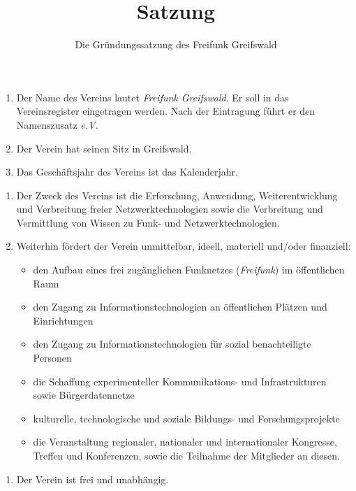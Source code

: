 \documentclass[parskip=half]{scrartcl}
\begin{document}
	\title{Satzung} 
	\author{Die Gründungssatzung des Freifunk Greifswald}
	\date{}
	\maketitle
	\begin{contract}
		\begin{enumerate}
			\item Der Name des Vereins lautet \textit{Freifunk Greifswald}. Er soll in das Vereinsregister eingetragen werden. Nach der Eintragung führt er den Namenszusatz \textit{e.V.}
			\item Der Verein hat seinen Sitz in Greifswald.
			\item Das Geschäftsjahr des Vereins ist das Kalenderjahr.
		\end{enumerate}
		\begin{enumerate}
			\item Der Zweck des Vereins ist die Erforschung, Anwendung, Weiterentwicklung und Verbreitung freier Netzwerktechnologien sowie die Verbreitung und Vermittlung von Wissen zu Funk- und Netzwerktechnologien.
			\item Weiterhin fördert der Verein unmittelbar, ideell, materiell und/oder finanziell:
			\begin{itemize}
				\item den Aufbau eines frei zugänglichen Funknetzes (\textit{Freifunk}) im öffentlichen Raum
				\item den Zugang zu Informationstechnologien an öffentlichen Plätzen und Einrichtungen
				\item den Zugang zu Informationstechnologien für sozial benachteiligte Personen
				\item die Schaffung experimenteller Kommunikations- und Infrastrukturen sowie Bürgerdatennetze
				\item kulturelle, technologische und soziale Bildungs- und Forschungsprojekte
				\item die Veranstaltung regionaler, nationaler und internationaler Kongresse, Treffen und Konferenzen, sowie die Teilnahme der Mitglieder an diesen.
			\end{itemize}
		\end{enumerate}
		\begin{enumerate}
			\item Der Verein ist frei und unabhängig.

\end{enumerate}
\end{contract}
\end{document}
